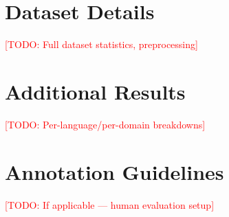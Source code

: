 \documentclass[11pt]{article}
\newcommand{\todo}[1]{\textcolor{red}{[TODO: #1]}}
\begin{document}





\appendix
\section{Dataset Details}
\label{app:data}
\todo{Full dataset statistics, preprocessing}

\section{Additional Results}
\label{app:results}
\todo{Per-language/per-domain breakdowns}

\section{Annotation Guidelines}
\label{app:annotation}
\todo{If applicable — human evaluation setup}
\end{document}
